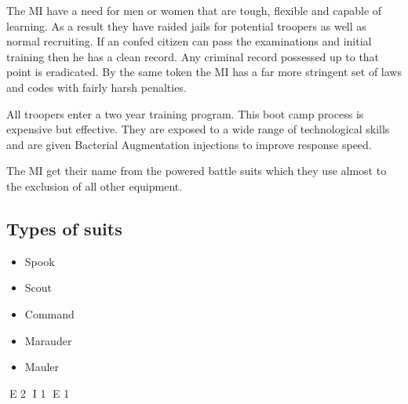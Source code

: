 The MI have a need for men or women that are tough, flexible and 
capable of learning. As a result they have raided jails for potential 
troopers as well as normal recruiting. If an confed citizen can pass 
the examinations and initial training then he has a clean record. Any 
criminal record possessed up to that point is eradicated. By the same 
token the MI has a far more stringent set of laws and codes with 
fairly harsh penalties. 

All troopers enter a two year training program. This boot camp 
process is expensive but effective. They are exposed to a wide range 
of technological skills and are given Bacterial Augmentation 
injections to improve response speed. 

The MI get their name from the powered battle suits which they use almost
to the exclusion of all other equipment. 

\subsection{Types of suits}

\begin{itemize}
	\item Spook
	\item Scout
	\item Command
	\item Marauder
	\item Mauler
\end{itemize}


E 2
I 1
E 1
